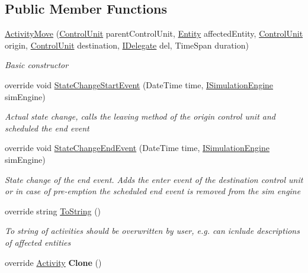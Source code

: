 \subsection*{Public Member Functions}
\begin{DoxyCompactItemize}
\item 
\hyperlink{class_general_health_care_elements_1_1_activities_1_1_activity_move_a6de1b9062538f2d8325d4f84c487a2b0}{Activity\+Move} (\hyperlink{class_simulation_core_1_1_h_c_c_m_elements_1_1_control_unit}{Control\+Unit} parent\+Control\+Unit, \hyperlink{class_simulation_core_1_1_h_c_c_m_elements_1_1_entity}{Entity} affected\+Entity, \hyperlink{class_simulation_core_1_1_h_c_c_m_elements_1_1_control_unit}{Control\+Unit} origin, \hyperlink{class_simulation_core_1_1_h_c_c_m_elements_1_1_control_unit}{Control\+Unit} destination, \hyperlink{interface_simulation_core_1_1_h_c_c_m_elements_1_1_i_delegate}{I\+Delegate} del, Time\+Span duration)
\begin{DoxyCompactList}\small\item\em Basic constructor \end{DoxyCompactList}\item 
override void \hyperlink{class_general_health_care_elements_1_1_activities_1_1_activity_move_ab774c9388d5772ba581b06d2cb24ec74}{State\+Change\+Start\+Event} (Date\+Time time, \hyperlink{interface_simulation_core_1_1_simulation_classes_1_1_i_simulation_engine}{I\+Simulation\+Engine} sim\+Engine)
\begin{DoxyCompactList}\small\item\em Actual state change, calls the leaving method of the origin control unit and scheduled the end event \end{DoxyCompactList}\item 
override void \hyperlink{class_general_health_care_elements_1_1_activities_1_1_activity_move_a5085b83d111f15222a24340deeb9adf9}{State\+Change\+End\+Event} (Date\+Time time, \hyperlink{interface_simulation_core_1_1_simulation_classes_1_1_i_simulation_engine}{I\+Simulation\+Engine} sim\+Engine)
\begin{DoxyCompactList}\small\item\em State change of the end event. Adds the enter event of the destination control unit or in case of pre-\/emption the scheduled end event is removed from the sim engine \end{DoxyCompactList}\item 
override string \hyperlink{class_general_health_care_elements_1_1_activities_1_1_activity_move_acd4c151cd8b9ce03a5dbdfb8958e7793}{To\+String} ()
\begin{DoxyCompactList}\small\item\em To string of activities should be overwritten by user, e.\+g. can icnlude descriptions of affected entities \end{DoxyCompactList}\item 
override \hyperlink{class_simulation_core_1_1_h_c_c_m_elements_1_1_activity}{Activity} {\bfseries Clone} ()\hypertarget{class_general_health_care_elements_1_1_activities_1_1_activity_move_ab06307075bf7387b83c4af9a78f658c6}{}\label{class_general_health_care_elements_1_1_activities_1_1_activity_move_ab06307075bf7387b83c4af9a78f658c6}


\end{DoxyCompactItemize}
